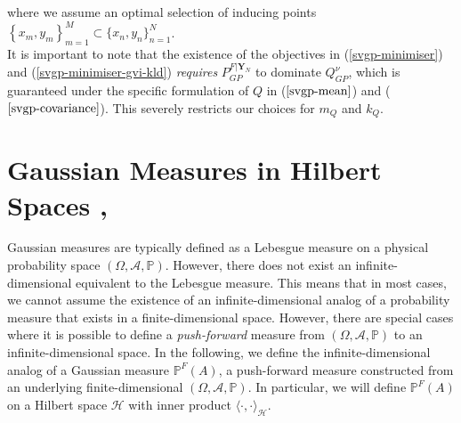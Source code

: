 \documentclass[twoside,11pt]{article}
\begin{document}
where we assume an optimal selection of inducing points $\left\{x_m, y_m\right\}_{m=1}^{M} \subset \{x_n, y_n\}_{n=1}^{N}$.
\\It is important to note that the existence of the objectives in (\ref{svgp-minimiser}) and (\ref{svgp-minimiser-gvi-kld}) \textit{requires} $P_{GP}^{F \vert \mathbf{Y}_N}$ to dominate $Q_{GP}^{\nu}$, which is  guaranteed under the specific formulation of $Q$ in ($\ref{svgp-mean}$) and ($\ref{svgp-covariance}$). This severely restricts our choices for $m_Q$ and $k_Q$. 
\section{Gaussian Measures in Hilbert Spaces \cite{wild2022generalized}, \cite{Kukush_2019}}
Gaussian measures are typically defined as a Lebesgue measure on a physical probability space $(\Omega, \mathcal{A}, \mathbb{P})$. However, there does not exist an infinite-dimensional equivalent to the Lebesgue measure. This means that in most cases, we cannot assume the existence of an infinite-dimensional analog of a probability measure that exists in a finite-dimensional space. However, there are special cases where it is possible to define a \textit{push-forward} measure from $(\Omega, \mathcal{A}, \mathbb{P})$ to an infinite-dimensional space. In the following, we define the infinite-dimensional analog of a Gaussian measure  $\mathbb{P}^{F}(A)$, a push-forward measure constructed from an underlying finite-dimensional $(\Omega, \mathcal{A}, \mathbb{P})$. In particular, we will define $\mathbb{P}^{F}(A)$ on a Hilbert space $\mathcal{H}$ with inner product $\langle \cdot, \cdot \rangle_\mathcal{H}$.
\end{document}
